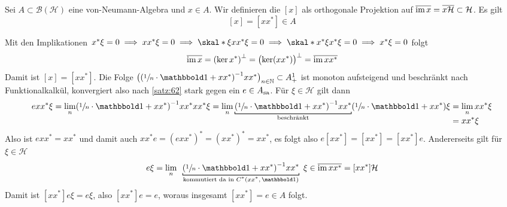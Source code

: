 \begin{definitionP}[label=def:610,{name=[Bildprojektion]}]
	Sei $A \subset \mathcal{B}(\mathcal{H})$ eine von-Neumann-Algebra und $x \in A$.
	Wir definieren die  $[x]$ als orthogonale Projektion auf $\overline{\im x} = \overline{x \mathcal{H}} \subset \mathcal{H}$. 
	Es gilt
	\[
		[x] = [xx^*] \in A
	\]
\end{definitionP}
\begin{beweis}
	Mit den Implikationen $x^* \xi=0 \implies xx^* \xi=0 \implies \skal*{\xi}{xx^*\xi}=0 \implies \skal*{x^* \xi}{x^*\xi}=0 \implies x^* \xi=0$ folgt
	\[
		\overline{\im x} = \enbrace*{\ker x^*}^\bot = \enbrace[\big]{\ker (xx^*)}^\bot = \overline{\im xx^*}
	\]
	Damit ist $[x]=[xx^*]$. 
	Die Folge $\enbrace[\big]{\enbrace*{\sfrac{1}{n} \cdot \ind + xx^*}^{-1} xx^*}_{n \in \mathbb{N}} \subset A_+^1$ ist monoton aufsteigend und beschränkt nach Funktionalkalkül, konvergiert also nach \autoref{satz:62} stark gegen ein $e \in A_\sa$.
	Für $\xi \in \mathcal{H}$ gilt dann
	\begin{align}
		e xx^* \xi = \lim_n \enbrace*{\sfrac{1}{n} \cdot \ind + xx^*}^{-1} xx^* xx^* \xi = \lim_n \Underbracket{\enbrace*{\sfrac{1}{n} \cdot \ind + xx^*}^{-1} xx^*}{\text{beschränkt} } \enbrace*{\sfrac{1}{n} \cdot \ind + xx^*} \xi 
		&= \lim_n xx^* \xi \\[-.8em] &= xx^* \xi
	\end{align}
	Also ist $exx^* = xx^*$ und damit auch $xx^*e=(e xx^*)^* = (xx^*)^* = xx^*$, es folgt also $e[xx^*] = [xx^*] = [xx^*]e$.
	Andererseits gilt für $\xi \in \mathcal{H}$
	\begin{align}
		e \xi = \lim_n \enspace\Underbracket{\enbrace*{\sfrac{1}{n} \cdot \ind + xx^*}^{-1} xx^*}{\mathclap{\text{kommutiert da in $C^*(xx^*,\ind)$}}}\enspace \xi \in \overline{\im xx^*}= [xx^*] \mathcal{H}
	\end{align}
	Damit ist $[xx^*]e \xi = e \xi$, also $[xx^*]e=e$, woraus insgesamt $[xx^*]=e \in A$ folgt.
\end{beweis}

